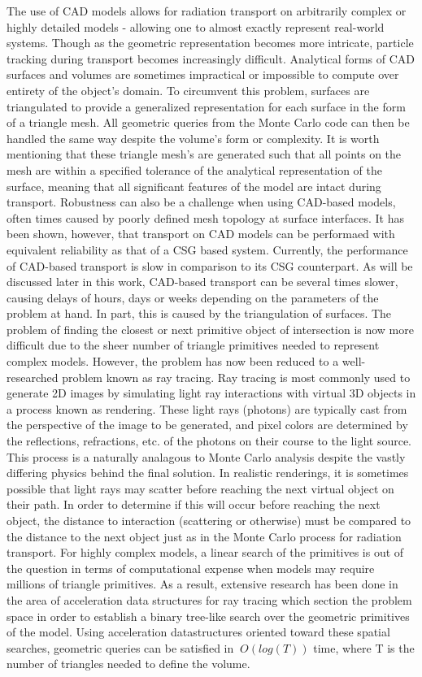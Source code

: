 \documentclass[12pt, a4paper]{article}
\begin{document}
The use of CAD models allows for radiation transport on arbitrarily complex or highly detailed models - allowing one to almost exactly represent real-world systems. Though as the geometric representation becomes more intricate, particle tracking during transport becomes increasingly difficult. Analytical forms of CAD surfaces and volumes are sometimes impractical or impossible to compute over entirety of the object's domain. To circumvent this problem, surfaces are triangulated to provide a generalized representation for each surface in the form of a triangle mesh. All geometric queries from the Monte Carlo code can then be handled the same way despite the volume's form or complexity. It is worth mentioning that these triangle mesh's are generated such that all points on the mesh are within a specified tolerance of the analytical representation of the surface, meaning that all significant features of the model are intact during transport. Robustness can also be a challenge when using CAD-based models, often times caused by poorly defined mesh topology at surface interfaces. It has been shown, however, that transport on CAD models can be performaed with equivalent reliability as that of a CSG based system\cite{smith_thesis_2011}. Currently, the performance of CAD-based transport is slow in comparison to its CSG counterpart. As will be discussed later in this work, CAD-based transport can be several times slower, causing delays of hours, days or weeks depending on the parameters of the problem at hand. In part, this is caused by the triangulation of surfaces. The problem of finding the closest or next primitive object of intersection is now more difficult due to the sheer number of triangle primitives needed to represent complex models. However, the problem has now been reduced to a well-researched problem known as ray tracing. Ray tracing is most commonly used to generate 2D images by simulating light ray interactions with virtual 3D objects in a process known as rendering. These light rays (photons) are typically cast from the perspective of the image to be generated, and pixel colors are determined by the reflections, refractions, etc. of the photons on their course to the light source. This process is a naturally analagous to Monte Carlo analysis despite the vastly differing physics behind the final solution. In realistic renderings, it is sometimes possible that light rays may scatter before reaching the next virtual object on their path. In order to determine if this will occur before reaching the next object, the distance to interaction (scattering or otherwise) must be compared to the distance to the next object just as in the Monte Carlo process for radiation transport. For highly complex models, a linear search of the primitives is out of the question in terms of computational expense when models may require millions of triangle primitives. As a result, extensive research has been done in the area of acceleration data structures for ray tracing which section the problem space in order to establish a binary tree-like search over the geometric primitives of the model. Using acceleration datastructures oriented toward these spatial searches, geometric queries can be satisfied in $~O(log(T))$ time, where T is the number of triangles needed to define the volume.
\end{document}
